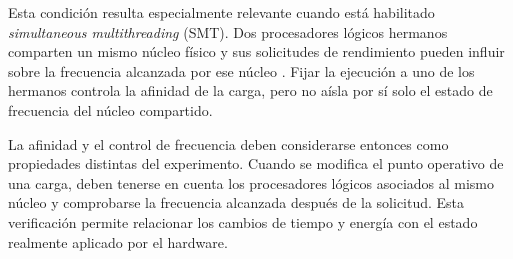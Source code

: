 Esta condición resulta especialmente relevante cuando está habilitado
\textit{simultaneous multithreading} (SMT). Dos procesadores lógicos hermanos
comparten un mismo núcleo físico y sus solicitudes de rendimiento pueden
influir sobre la frecuencia alcanzada por ese núcleo
\cite{LinuxIntelPstate2026}. Fijar la ejecución a uno de los hermanos controla
la afinidad de la carga, pero no aísla por sí solo el estado de frecuencia del
núcleo compartido.

La afinidad y el control de frecuencia deben considerarse entonces como
propiedades distintas del experimento. Cuando se modifica el punto operativo
de una carga, deben tenerse en cuenta los procesadores lógicos asociados al
mismo núcleo y comprobarse la frecuencia alcanzada después de la solicitud.
Esta verificación permite relacionar los cambios de tiempo y energía con el
estado realmente aplicado por el hardware.


